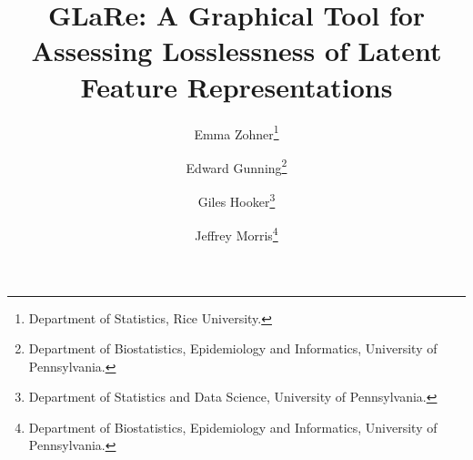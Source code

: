 \documentclass[12pt]{article}
\title{GLaRe: A Graphical Tool for Assessing
Losslessness of Latent Feature Representations}
\author{
Emma Zohner\thanks{Department of Statistics, Rice University.}
\and
Edward Gunning\thanks{Department of Biostatistics, Epidemiology and Informatics, University of Pennsylvania.}
\and
Giles Hooker\thanks{Department of Statistics and Data Science, University of Pennsylvania.} 
\and
Jeffrey Morris\thanks{Department of Biostatistics, Epidemiology and Informatics, University of Pennsylvania.}
}
\date{}
\newcommand{\1}{\mathbf{1}}
\begin{document}
\maketitle



\begin{abstract}

\end{abstract}

\clearpage

\tableofcontents

\clearpage







\clearpage

\appendix





\clearpage
\printbibliography
\end{document}
